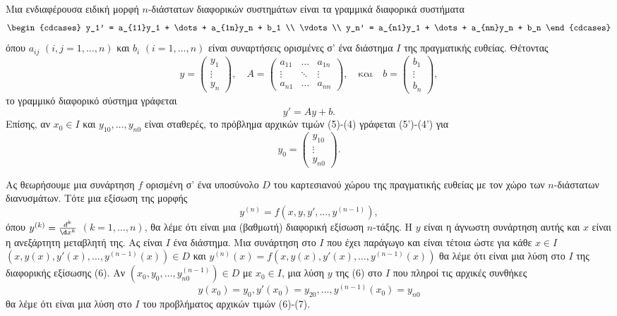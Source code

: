 \documentclass[11pt,a4paper,twoside]{book}
\begin{document}
Μια ενδιαφέρουσα ειδική μορφή $n$-διάστατων διαφορικών συστημάτων είναι τα γραμμικά διαφορικά συστήματα
\begin{equation}
\begin{cdcases}
y_1' = a_{11}y_1 + \dots + a_{1n}y_n + b_1 \\
\vdots \\
y_n' = a_{n1}y_1 + \dots + a_{nn}y_n + b_n
\end{cdcases}
\end{equation}
όπου $a_{ij}$ $(i,j=1,\dots,n)$ και $b_i$ $(i=1,\dots,n)$ είναι συναρτήσεις ορισμένες σ' ένα διάστημα $I$ της πραγματικής ευθείας. Θέτοντας
\[
y = \begin{pmatrix} y_1 \\ \vdots \\ y_n \end{pmatrix}, \quad A = \begin{pmatrix} a_{11} & \dots & a_{1n} \\ \vdots & \ddots & \vdots \\ a_{n1} & \dots & a_{nn} \end{pmatrix}, \quad \text{και} \quad b = \begin{pmatrix} b_1 \\ \vdots \\ b_n \end{pmatrix},
\]
το γραμμικό διαφορικό σύστημα γράφεται
\begin{equation*} \label{eq:5prime}
y' = Ay+b. \tag{5'}
\end{equation*}
Επίσης, αν $x_0 \in I$ και $y_{10}, \dots, y_{n0}$ είναι σταθερές, το πρόβλημα αρχικών τιμών (5)-(4) γράφεται (5')-(4') για
\[
y_0 = \begin{pmatrix} y_{10} \\ \vdots \\ y_{n0} \end{pmatrix}.
\]

Ας θεωρήσουμε μια συνάρτηση $f$ ορισμένη σ' ένα υποσύνολο $D$ του καρτεσιανού χώρου της πραγματικής ευθείας με τον χώρο των $n$-διάστατων διανυσμάτων. Τότε μια εξίσωση της μορφής
\begin{equation}
y^{(n)} = f(x,y,y', \dots, y^{(n-1)}),
\end{equation}
όπου $y^{(k)} = \frac{d^k}{\d x^k}$ $(k=1, \dots, n)$, θα λέμε ότι είναι μια (βαθμωτή) διαφορική εξίσωση $n$-τάξης. Η $y$ είναι η άγνωστη συνάρτηση αυτής και $x$ είναι η ανεξάρτητη μεταβλητή της. Ας είναι $I$ ένα διάστημα. Μια συνάρτηση στο $I$ που έχει παράγωγο και είναι τέτοια ώστε για κάθε $x \in I$
$(x, y(x), y'(x), \dots, y^{(n-1)}(x)) \in D$ και $y^{(n)}(x) = f(x, y(x), y'(x), \dots, y^{(n-1)}(x))$
θα λέμε ότι είναι μια λύση στο $I$ της διαφορικής εξίσωσης (6). Αν $(x_0, y_0, \dots, y_{n0}^{(n-1)}) \in D$ με $x_0 \in I$, μια λύση $y$ της (6) στο $I$ που πληροί τις αρχικές συνθήκες
\begin{equation}
y(x_0)=y_0, y'(x_0)=y_{20}, \dots, y^{(n-1)}(x_0)=y_{n0}
\end{equation}
θα λέμε ότι είναι μια λύση στο $I$ του προβλήματος αρχικών τιμών (6)-(7).
\end{document}
